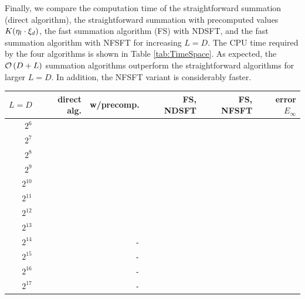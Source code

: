 Finally, we compare the computation time of the straightforward summation 
(direct algorithm), the straightforward summation with precomputed values 
$K{\hspace{-0.4ex}}\left(\mathbf{\eta}_{l} \cdot \mathbf{\xi}_{d}\right)$, the fast summation algorithm (FS) 
with NDSFT, and the fast summation algorithm with NFSFT for increasing $L=D$.
The CPU time required by the four algorithms is shown in Table 
\ref{tab:TimeSpace}. As expected, the $\mathcal{O}\left(D + L\right)$ summation algorithms outperform the
straightforward algorithms for larger $L=D$. In addition, the NFSFT variant is 
considerably faster.

\begin{table}[ht]
  \begin{center}
    \begin{tabular}{r|r|r|r|r|r}
        $L = D$ & direct alg. & w/precomp. & FS, NDSFT & FS, NFSFT & error $E_{\infty}$\\\hline
           $2^6$ & \verb#1.0E-05# & \verb#8.0E-05# & \verb#1.1E-01# & \verb#6.2E-01# & \verb#7.7E-14# \\
           $2^7$ & \verb#6.0E-05# & \verb#3.8E-04# & \verb#2.2E-01# & \verb#6.2E-01# & \verb#6.5E-14# \\
           $2^8$ & \verb#2.5E-04# & \verb#1.4E-03# & \verb#4.5E-01# & \verb#6.2E-01# & \verb#4.1E-14# \\
           $2^9$ & \verb#1.0E-03# & \verb#5.3E-03# & \verb#8.9E-01# & \verb#6.3E-01# & \verb#2.8E-14# \\
        $2^{10}$ & \verb#4.0E-02# & \verb#2.1E-02# & \verb#1.8E+00# & \verb#6.5E-01# & \verb#3.6E-14# \\
        $2^{11}$ & \verb#1.6E+00# & \verb#8.3E-02# & \verb#3.6E+00# & \verb#6.6E-01# & \verb#1.8E-14# \\
        $2^{12}$ & \verb#6.4E+00# & \verb#3.5E-01# & \verb#7.1E+00# & \verb#7.2E-01# & \verb#1.3E-14# \\
        $2^{13}$ & \verb#2.6E+01# & \verb#1.4E+00# & \verb#1.4E+01# & \verb#8.2E-01# & \verb#6.7E-15# \\
        $2^{14}$ & \verb#1.0E+02# & \verb#-#       & \verb#2.8E+01# & \verb#1.0E+00# & \verb#5.5E-15# \\
        $2^{15}$ & \verb#4.1E+02# & \verb#-#       & \verb#5.7E+01# & \verb#1.5E+00# & \verb#4.0E-15# \\
        $2^{16}$ & \verb#1.6E+03# & \verb#-#       & \verb#1.1E+02# & \verb#2.3E+00# & \verb#2.9E-15# \\
        $2^{17}$ & \verb#6.6E+03# & \verb#-#       & \verb#2.3E+02# & \verb#4.0E+00# & \verb#2.4E-15# \\

\end{tabular}
\end{center}
\end{table}
